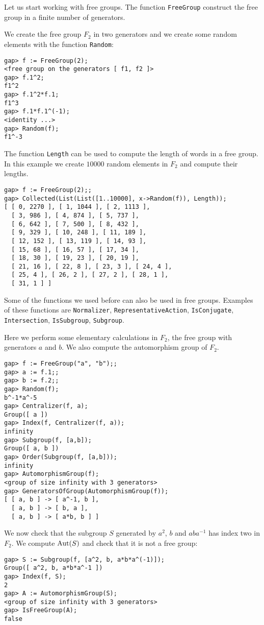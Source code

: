 Let us start working with free groups.  The function \lstinline{FreeGroup}
construct the free group in a finite number of generators. 

\begin{example}
We create the free group $F_2$ in two generators and we create some random
elements with the function 
\lstinline{Random}:
\begin{lstlisting}
gap> f := FreeGroup(2);
<free group on the generators [ f1, f2 ]>
gap> f.1^2;
f1^2
gap> f.1^2*f.1;
f1^3
gap> f.1*f.1^(-1);
<identity ...>
gap> Random(f);
f1^-3
\end{lstlisting}
\end{example}

\begin{example}
	The function \lstinline{Length} can be used to compute the length of words in a
	free group. 
	In this example we create $10000$ random elements in $F_2$ and compute their lengths.
\begin{lstlisting}
gap> f := FreeGroup(2);;
gap> Collected(List(List([1..10000], x->Random(f)), Length));
[ [ 0, 2270 ], [ 1, 1044 ], [ 2, 1113 ], 
  [ 3, 986 ], [ 4, 874 ], [ 5, 737 ], 
  [ 6, 642 ], [ 7, 500 ], [ 8, 432 ], 
  [ 9, 329 ], [ 10, 248 ], [ 11, 189 ], 
  [ 12, 152 ], [ 13, 119 ], [ 14, 93 ], 
  [ 15, 68 ], [ 16, 57 ], [ 17, 34 ], 
  [ 18, 30 ], [ 19, 23 ], [ 20, 19 ], 
  [ 21, 16 ], [ 22, 8 ], [ 23, 3 ], [ 24, 4 ], 
  [ 25, 4 ], [ 26, 2 ], [ 27, 2 ], [ 28, 1 ], 
  [ 31, 1 ] ]
\end{lstlisting}
\end{example}

Some of the functions we used before can also be used in free groups. Examples
of these functions are \lstinline{Normalizer},
\lstinline{RepresentativeAction}, \lstinline{IsConjugate},
\lstinline{Intersection}, \lstinline{IsSubgroup}, \lstinline{Subgroup}. 

\begin{example}
Here we perform some elementary calculations in $F_2$, the free group with
generators $a$ and $b$. We also compute the automorphism group of $F_2$. 
\begin{lstlisting}
gap> f := FreeGroup("a", "b");;
gap> a := f.1;;
gap> b := f.2;;
gap> Random(f);
b^-1*a^-5
gap> Centralizer(f, a);
Group([ a ])
gap> Index(f, Centralizer(f, a));
infinity
gap> Subgroup(f, [a,b]);
Group([ a, b ])
gap> Order(Subgroup(f, [a,b]));
infinity
gap> AutomorphismGroup(f);
<group of size infinity with 3 generators>
gap> GeneratorsOfGroup(AutomorphismGroup(f));
[ [ a, b ] -> [ a^-1, b ], 
  [ a, b ] -> [ b, a ], 
  [ a, b ] -> [ a*b, b ] ]
\end{lstlisting}
We now check that the subgroup $S$ generated by $a^2$, $b$ and $aba^{-1}$ has
index two in $F_2$. We compute $\operatorname{Aut}(S)$ and check that it is not a free
group: 
\begin{lstlisting}
gap> S := Subgroup(f, [a^2, b, a*b*a^(-1)]);
Group([ a^2, b, a*b*a^-1 ])
gap> Index(f, S);
2
gap> A := AutomorphismGroup(S);
<group of size infinity with 3 generators>
gap> IsFreeGroup(A);
false
\end{lstlisting}
\end{example}

